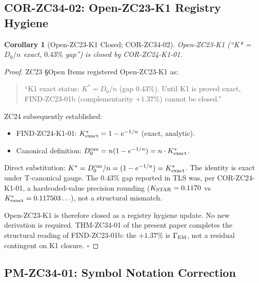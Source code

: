 \documentclass[12pt, a4paper]{article}
\newtheorem{corollary}{Corollary}[section]
\begin{document}
\subsection{COR-ZC34-02: Open-ZC23-K1 Registry Hygiene}
\label{sec:cor-02}

\begin{corollary}[Open-ZC23-K1 Closed; COR-ZC34-02]
\label{cor:zc34-02}
Open-ZC23-K1 (``K* = $D_0/n$ exact, $0.43\%$ gap'') is closed
by COR-ZC24-K1-01.
\end{corollary}

\begin{proof}
ZC23 \S Open Items registered Open-ZC23-K1 as:
\begin{quote}\small
``K1 exact status: $K^* = D_0/n$ (gap $0.43\%$). Until K1 is
proved exact, FIND-ZC23-01b (complementarity $+1.37\%$) cannot
be closed.''
\end{quote}
ZC24 subsequently established:
\begin{itemize}[leftmargin=*, noitemsep]
  \item FIND-ZC24-K1-01: $K^*_{\rm exact} = 1 - e^{-1/n}$
    (exact, analytic).
  \item Canonical definition: $D_0^{\rm can} = n(1 - e^{-1/n})
    = n \cdot K^*_{\rm exact}$.
\end{itemize}
Direct substitution: $K^* = D_0^{\rm can}/n = (1 - e^{-1/n})
= K^*_{\rm exact}$. The identity is exact under T-canonical
gauge. The $0.43\%$ gap reported in TLS was, per COR-ZC24-K1-01,
a hardcoded-value precision rounding ($K_{\rm STAR} = 0.1170$
vs $K^*_{\rm exact} = 0.117503\ldots$), not a structural mismatch.

\medskip
Open-ZC23-K1 is therefore closed as a registry hygiene update.
No new derivation is required. THM-ZC34-01 of the present
paper completes the structural reading of FIND-ZC23-01b:
the $+1.37\%$ is $\Gamma_{\rm EM}$, not a residual contingent
on K1 closure.
\hfill$\square$
\end{proof}

\subsection{PM-ZC34-01: Symbol Notation Correction}
\label{sec:pm-01}
\end{document}
